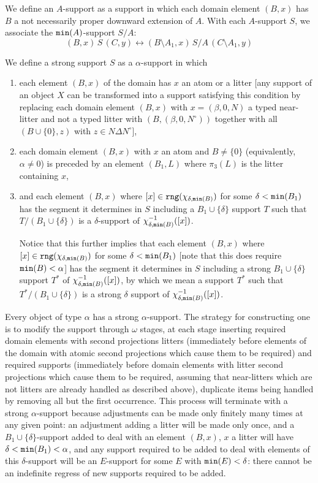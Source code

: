\documentclass[12pt]{article}
\begin{document}
We define an $A$-support as a support in which each domain element $(B,x)$ has $B$ a not necessarily proper downward extension of $A$.  With each $A$-support $S$, we associate the ${\tt min}(A)$-support $S/A$:  $$(B,x)\,S\,(C,y) \leftrightarrow (B\setminus A_1,x)\,S/A\,(C\setminus A_1,y) $$

We define a strong support $S$ as a $\alpha$-support in which 
\begin{enumerate}

\item each element $(B,x)$ of the domain has $x$ an atom or a litter [any support of an object $X$ can be transformed into a support satisfying this condition by replacing each domain
element $(B,x)$ with $x=(\beta,0,N)$ a typed near-litter and not a typed litter with $(B,(\beta,0,N^\circ))$ together with all $(B \cup \{0\},z)$ with $z \in N \Delta N^\circ$], 

\item each domain element $(B,x)$ with $x$ an atom and $B \neq \{0\}$ (equivalently, $\alpha \neq 0$) is preceded
by an element $(B_1,L)$ where $\pi_3(L)$ is the litter containing $x$, \item and each element $(B,x)$ where $[x] \in {\tt rng}(\chi_{\delta,{\tt min}(B)})$ for some $\delta<{\tt min}(B_1)$ has the segment it determines in $S$ including a $B_1 \cup \{\delta\}$ support $T$ such
that $T/(B_1 \cup \{\delta\})$ is a $\delta$-support of $\chi_{\delta,{\tt min}(B)}^{-1}([x])$.

Notice that this further implies that each element $(B,x)$ where $[x] \in {\tt rng}(\chi_{\delta,{\tt min}(B)})$ for some $\delta<{\tt min}(B_1)$ [note that this does require ${\tt min}(B)<\alpha$] has the segment it determines in $S$ including a strong $B_1 \cup \{\delta\}$ support $T^*$  of $\chi_{\delta,{\tt min}(B)}^{-1}([x])$, by which we mean a support $T^*$ such that $T^* /(B_1 \cup \{\delta\})$ is a strong $\delta$ support of  $\chi_{\delta,{\tt min}(B)}^{-1}([x])$.
\end{enumerate}

Every object of type $\alpha$ has a strong $\alpha$-support.   The strategy for constructing one is to modify the support through $\omega$ stages, at each stage inserting required domain elements with second projections litters (immediately before elements of the domain with atomic second projections which cause them to be required) and required supports (immediately before domain elements with litter second projections which cause them to be required, assuming that near-litters which are not litters are already handled as described above), duplicate items being handled by removing all but the first occurrence.
This process will terminate with a strong $\alpha$-support because adjustments can be made only finitely many times at any given point:   an adjustment adding a litter will be made only once, and a $B_1 \cup \{\delta\}$-support added to deal with an element $(B,x)$, $x$ a litter will have $\delta < {\tt min}(B_1)<\alpha$, and any support required to be added to deal with elements of this $\delta$-support will be an $E$-support for some $E$ with ${\tt min}(E)<\delta$:  there cannot be an indefinite regress of new supports required to be added.
\end{document}
